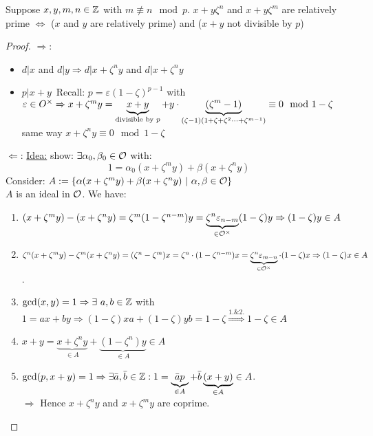 
\begin{Lem}
Suppose $x,y,m,n \in \mathbb{Z}$ with $m \not \equiv n \mod p$.
$x+y\zeta^n$ and $x+y\zeta^m$ are relatively prime $\iff$ ($x$ and $y$ are relatively prime) and ($x+y$ not divisible by $p$)
\end{Lem}

\begin{proof}
\glqq $\Rightarrow$\grqq: \begin{itemize}
\item $d|x$ and $d|y \Rightarrow d|x+\zeta^ny$ and $d| x+\zeta^ny$ \Lightning
\item \glqq $p| x+y$\grqq\ Recall: $p= \varepsilon (1-\zeta)^{p-1}$ with $\varepsilon \in O^\times\\
\Rightarrow x+\zeta^my = \underbrace{x+y}_{\text{divisible by } p} +y\cdot\underbrace{(\zeta^m-1)}_{(\zeta-1)(1+\zeta+\zeta^2\dots + \zeta^{m-1})} \equiv 0 \mod 1-\zeta$\\
same way $x+\zeta^ny \equiv 0 \mod 1- \zeta$ \Lightning
\end{itemize}
\glqq $\Leftarrow$\grqq: \underline{Idea:} show: $\exists \alpha_0, \beta_0 \in \mathcal{O}$ with:
\[1= \alpha_0(x+\zeta^m y) + \beta (x+ \zeta^ny)\]
Consider: $A:= \{\alpha (x+\zeta^my)+\beta(x+\zeta^ny) \ | \ \alpha,\beta \in \mathcal{O} \}$\\
$A$ is an ideal in $\mathcal{O}$. We have:
\begin{enumerate}
\item $(x+\zeta^m y) - (x+\zeta^n y) = \zeta^m(1-\zeta^{n-m})y= \underbrace{\zeta^n\varepsilon_{n-m}}_{\in \mathcal{O}^\times} (1 - \zeta)y \Rightarrow (1 - \zeta)y \in A$
\item $\zeta^n (x+ \zeta^my) - \zeta^m(x+\zeta^ny)=(\zeta^n-\zeta^m)x= \zeta^n\cdot(1-\zeta^{n-m})x=\underbrace{\zeta^n \varepsilon_{m-n}}_{\in \mathcal{O}^\times} \cdot (1- \zeta)x \Rightarrow (1- \zeta) x \in A$.
\item $\gcd(x,y)=1 \Rightarrow \exists \ a,b \in \mathbb{Z}$ with $1=ax+by \Rightarrow (1-\zeta)xa +(1-\zeta)yb = 1-\zeta \stackrel{1.\& 2.}{\Rightarrow} 1- \zeta \in A$
\item $x+y = \underbrace{x+ \zeta^ny}_{\in A} + \underbrace{(1- \zeta^n)y}_{\in A} \in A$
\item $\gcd(p,x+y)=1 \Rightarrow \exists \bar{a}, \bar{b} \in \mathbb{Z}: 1= \underbrace{\bar{a}p}_{\in A}+\bar{b}\underbrace{(x+y)}_{\in A} \in A$.\\
$\Rightarrow$ Hence $x+\zeta^ny$ and $x+ \zeta^my$ are coprime.
\end{enumerate}
\end{proof}

